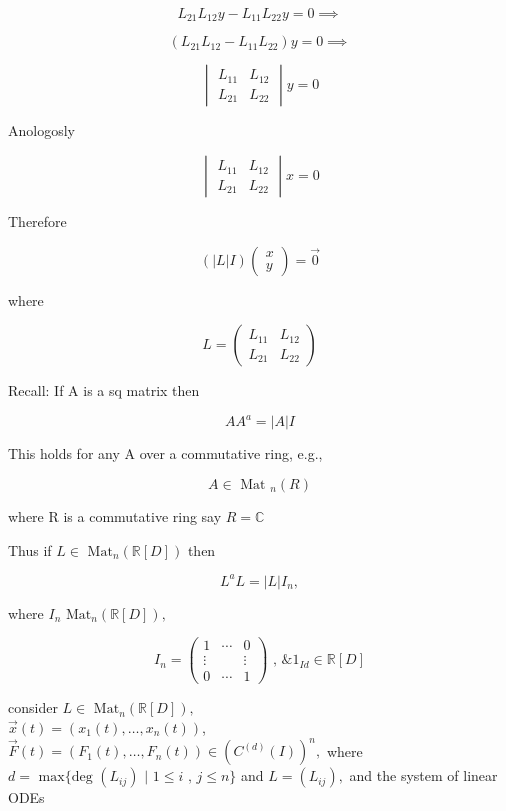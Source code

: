 \begin{example}
  \hline

  \[ L_{21}L_{12}y - L_{11}L_{22}y = 0 \implies \]

  \[ (L_{21}L_{12} - L_{11}L_{22}) y= 0 \implies \]

  \[ 
  \begin{vmatrix}
    L_{11} & L_{12} \\
    L_{21} & L_{22}
  \end{vmatrix}
  y
  = 0
  \]

  Anologosly 

  
  \[ 
  \begin{vmatrix}
    L_{11} & L_{12} \\
    L_{21} & L_{22}
  \end{vmatrix}
  x
  = 0
  \]

  Therefore

  \[ ( |L|I) 
  \begin{pmatrix}
    x \\
    y
  \end{pmatrix}
   = \vec{0}
  \]

  where

  \[
  L=
  \begin{pmatrix}
    L_{11} & L_{12} \\
    L_{21} & L_{22}
  \end{pmatrix}
  \]

  Recall: If A is a sq matrix then 

  \[ AA^a = |A|I \]

  This holds for any A over a commutative ring, e.g., 

  \[ A \in \text{ Mat }_n(R) \]

  where R is a commutative ring say \( R = \mathbb{C} \)

  Thus if \( L \in \text{ Mat}_n( \mathbb{R}[D]) \) then 

  \[ L^aL = |L|I_n, \]

  where \( I_n \text{ Mat}_n( \mathbb{R}[D]),  \)

\[ 
I_n = 
\begin{pmatrix}
  1 & \cdots & 0 \\
  \vdots &  & \vdots \\
  0 & \cdots & 1
\end{pmatrix}
\text{ , \& }
1_{Id} \in \mathbb{R}[D]
\]

consider \( L \in \text{ Mat}_n( \mathbb{R}[D]), \) \\

\( \vec{x}(t) = (x_1(t), \dots , x_n(t)) \), \( \vec{F}(t) = (F_1(t),
\dots, F_n(t)) \in (C^{(d)}(I))^n,\) where \( d= \text{ max} \{ \text{
deg }(L_{ij}) \text{ | } 1 \leq i \text{ , } j \leq n \} \) and \( L =
(L_{ij}),  \) and the system of linear ODEs


\end{example}
